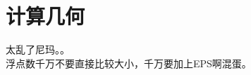 \section{计算几何}
    太乱了尼玛。。\\
    浮点数千万不要直接比较大小，千万要加上EPS啊混蛋。\\
    
    
    
    
    
     
    
    